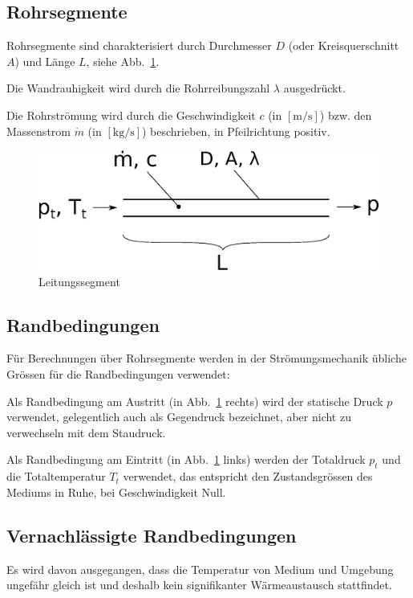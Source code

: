 \documentclass[a4paper,10pt,twocolumn]{article}
\begin{document}
\subsection{Rohrsegmente}

Rohrsegmente sind charakterisiert durch Durchmesser $D$ (oder Kreisquerschnitt $A$) und Länge $L$, siehe Abb.~\ref{fig:leitungssegment}.

Die Wandrauhigkeit wird durch die Rohrreibungszahl $\lambda$ ausgedrückt.

Die Rohrströmung wird durch die Geschwindigkeit $c$ (in $\mathrm{[m/s]}$) bzw. den Massenstrom $\dot m$ (in $\mathrm{[kg/s]}$) beschrieben, in Pfeilrichtung positiv.

\begin{figure}[hbp]
\centering
\includegraphics[width=0.9\hsize]{problem.eps}
\caption{Leitungssegment}
\label{fig:leitungssegment}
\end{figure}

\subsection{Randbedingungen}

Für Berechnungen über Rohrsegmente werden in der Strömungsmechanik übliche Grössen für die Randbedingungen verwendet:

Als Randbedingung am Austritt (in Abb.~\ref{fig:leitungssegment} rechts) wird der statische Druck $p$ verwendet, gelegentlich auch als Gegendruck bezeichnet, aber nicht zu verwechseln mit dem Staudruck.

Als Randbedingung am Eintritt (in Abb.~\ref{fig:leitungssegment} links) werden der Totaldruck $p_t$ und die Totaltemperatur $T_t$ verwendet, das entspricht den Zustandsgrössen des Mediums in Ruhe, bei Geschwindigkeit Null.

\subsection{Vernachlässigte Randbedingungen}

Es wird davon ausgegangen, dass die Temperatur von Medium und Umgebung ungefähr gleich ist und deshalb kein signifikanter Wärmeaustausch stattfindet.
\end{document}
